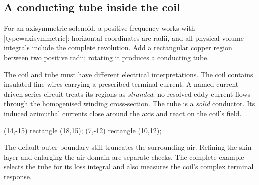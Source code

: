 
\begin{codeexample}[width=0pt]
\end{codeexample}


\subsection{A conducting tube inside the coil}
For an axisymmetric solenoid, a positive frequency works with
|type=axisymmetric|: horizontal coordinates are radii, and all physical volume
integrals include the complete revolution. Add a rectangular copper region
between two positive radii; rotating it produces a conducting tube.

The coil and tube must have different electrical interpretations. The coil
contains insulated fine wires carrying a prescribed terminal current. A named
current-driven series circuit treats its regions as \emph{stranded}: no
resolved eddy current flows through the homogenised winding cross-section.
The tube is a \emph{solid} conductor. Its induced azimuthal currents close around
the axis and react on the coil's field.
\begin{codeexample}
\fill[femm/region={material=copper,circuit=drive,
  turns=100,winding fill=.6,mesh size=1}]
  (14,-15) rectangle (18,15);
\fill[femm/region={material=copper,conductor=solid,mesh size=.5}]
  (7,-12) rectangle (10,12);
\end{codeexample}
The default outer boundary still truncates the surrounding air. Refining the
skin layer and enlarging the air domain are separate checks. The complete
example selects the tube for its loss integral and also measures the coil's
complex terminal response.

